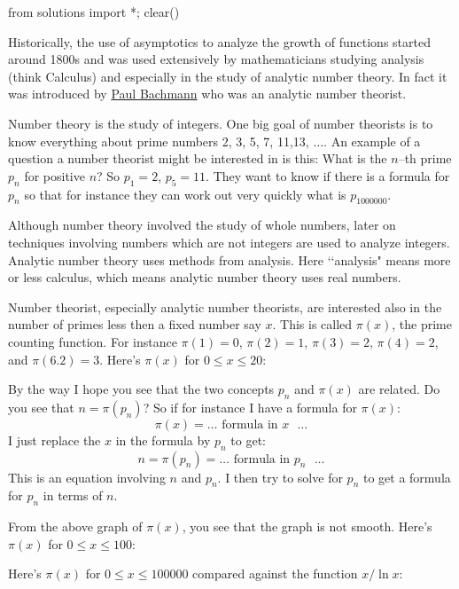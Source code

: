\begin{python0}
from solutions import *; clear()
\end{python0}

Historically, the use of asymptotics to analyze the
growth of functions started around 1800s and was used extensively
by mathematicians studying analysis (think Calculus) and
especially in the study of analytic number theory. In fact it was
introduced by
\href{https://en.wikipedia.org/wiki/Paul_Gustav_Heinrich_Bachmann}{Paul Bachmann}
who was an analytic number theorist.

Number theory is the study of integers.
One big goal of number
theorists is to know everything about prime numbers 2, 3, 5, 7,
11,13, $\ldots$.
An example of a question a number theorist might be interested in
is this:
What is the $n$--th prime $p_n$ for positive $n$?
So $p_1 = 2$, $p_5 = 11$.
They want to know if there is a formula for $p_n$ so that for
instance they can work out very quickly what is $p_{1000000}$.

Although number theory involved the study of whole
numbers, later on techniques involving numbers
which are not integers are used to analyze integers.
Analytic number theory uses methods from analysis.
Here \lq\lq analysis" means more or less calculus,
which means analytic number theory uses real numbers.

Number theorist, especially analytic number theorists,
are interested also in the number of primes less then a fixed
number say $x$.
This is called $\pi(x)$, the prime counting function.
For instance
$\pi(1) = 0$,
$\pi(2) = 1$,
$\pi(3) = 2$,
$\pi(4) = 2$, and
$\pi(6.2) = 3$.
Here's $\pi(x)$ for $0 \leq x \leq 20$:


By the way I hope you see that the two
concepts $p_n$ and $\pi(x)$ are related.
Do you see that $n = \pi(p_n)$? So if for
instance I have a formula for $\pi(x)$:
\[
 \pi(x) = \ldots \text{ formula in $x$ } \ldots
\]
I just replace the $x$ in the formula by $p_n$ to get:
\[
 n = \pi(p_n) = \ldots \text{ formula in $p_n$ } \ldots
\]
This is an equation involving $n$ and $p_n$. I then try to solve
for $p_n$ to get a formula for $p_n$ in terms of $n$.

From the above graph of $\pi(x)$, you see that the graph is
not smooth.
Here's $\pi(x)$ for $0 \leq x \leq 100$:

Here's $\pi(x)$ for $0 \leq x \leq 100000$ compared against the function $x/\ln x$:


